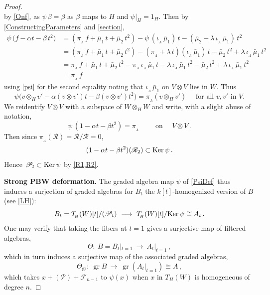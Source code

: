 \documentclass[11pt]{amsart}
\numberwithin{equation}{section}
\DeclareMathOperator{\gr}{gr}
\newcommand{\BBB}{B}
\newcommand{\sA}{A }
\newcommand{\RR}{\mathscr{R} }
\newcommand{\PP}{\mathscr{P}}
\renewcommand{\_}[1]{\mbox{$_{\left( #1 \right)}$}}
\renewcommand{\ker}{\mbox{\rm Ker\,}}
\newcommand{\ot}{\otimes}
\begin{document}
{\begin{proof}
$$$$
by \cref{Onf}, as $\psi\, \beta=\beta$ as $\beta$ maps to $H$ and
$\psi\big|_{H}=1_H$. Then by \cref{ConstructingParameters}
and \cref{section},
$$
\begin{aligned}
  \psi \, \big(
  f
  - \alpha t 
  - \beta\,  t^2
  \big)   
&=(  \pi_{_\sA}\, f+\bar\mu_1\, t +\bar\mu_2\, t^2)
  - \psi\, (\iota_{_\sA}\,\bar\mu_1)\,  t
  -(\bar\mu_2   -\lambda\,\iota_{_\sA}\, \bar\mu_1)\, t^2
\\
&=
(  \pi_{_\sA}\, f+\bar\mu_1\, t +\bar\mu_2\, t^2)
  - (\pi_{_\sA}+ \lambda\, t)(\iota_{_\sA}\, \bar\mu_1)\, t
  -\bar\mu_2 \,t^2  +\lambda\,\iota_{_\sA}\, \bar\mu_1\, t^2
  \\
  &=
    \pi_{_\sA}\, f +\bar\mu_1\, t +\bar\mu_2\, t^2
    - \pi_{_\sA}\, \iota_{_\sA}\, \bar\mu_1\, t
    - \lambda\, \iota_{_\sA}\, \bar\mu_1\, t^2
  -\bar\mu_2 \,t^2  +\lambda\,\iota_{_\sA}\, \bar\mu_1\, t^2
  \\
  &= \pi_{_\sA}\, f
\end{aligned}
$$
using \cref{psi} for the second equality
noting that $\iota_{_\sA}\, \bar\mu_1$ on $V\ot V$ lies in $W$.
Thus
$$
\psi\big( v\ot_H v' -\alpha(v\ot v')t - \beta(v\ot v')t^2 \big)
=
\pi_{_\sA}(v\ot_H v')
\quad\text{ for all $v,v'$ in $V$}.
$$
We reidentify $V\ot V$ with a subspace of $W\ot_H W$
and write, with a slight abuse of notation, 
$$
\psi\, (1-\alpha t-\beta t^2)=\pi_{_\sA}
\qquad\text{ on }\quad V\ot V\, .
$$
Then since $\pi_{_\sA}(\RR)=\RR/\RR=0$,
\begin{equation}\label{R2}
(1
  - \alpha t
  - \beta t^2)(\RR_2)
  \subset
  \ker \psi
  \, .
\end{equation}
Hence 
$\PP_t\subset \ker \psi$ by \cref{R1,R2}.

{\bf Strong PBW deformation.}
The graded algebra map
$\psi$ of \cref{PsiDef}
thus induces a surjection of graded algebras
for $B_t$ the $k[t]$-homogenized version of $B$
(see \cref{LH}):
      $$ \BBB_t =  T_{\! _H}(W)[t]/(\PP_t)
   \ \longrightarrow\ T_{\! _H}(W)[t]/\ker \psi
   \cong \sA_t
   \, .
   $$
One may verify that
taking the fibers at $t=1$ gives
a surjective map of filtered algebras,
 $$ \Theta:\
 \BBB 
 =\BBB_t|_{t=1}  \  \longrightarrow\ \sA_t|_{t=1} \,  ,
 $$ 
which in turn induces a surjective map of the associated graded 
algebras, 
 $$ \Theta_{\gr}:\ 
 \gr \BBB \
 \longrightarrow\ \gr (\sA_t|_{t=1}) \cong \sA 
 \, ,$$
 which takes $x+(\PP)+\mathcal{F}_{n-1}$
 to $\psi(x)$ when 
$x$ in $T_H(W)$ is homogeneous of degree $n$.
 

\end{proof}}
\end{document}
